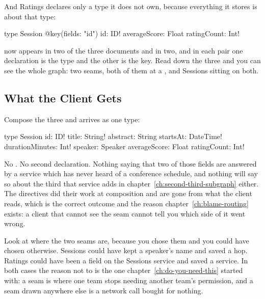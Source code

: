 %
And Ratings declares only a type it does not own, because everything it
stores is about that type:

\begin{graphqlsdl}
type Session @key(fields: "id") {
  id: ID!
  averageScore: Float
  ratingCount: Int!
}
\end{graphqlsdl}

%
 now appears in two of the three documents and  in
two, and in each pair one declaration is the type and the other is the key. Read
down the three and you can see the whole graph: two seams, both of them at a
, and Sessions sitting on both.

\subsection{What the Client Gets}

%
Compose the three and  arrives as one type:

\begin{graphqlsdl}
type Session {
  id: ID!
  title: String!
  abstract: String
  startsAt: DateTime!
  durationMinutes: Int!
  speaker: Speaker
  averageScore: Float
  ratingCount: Int!
}
\end{graphqlsdl}

%
No . No second declaration. Nothing saying that two of those fields
are answered by a service which has never heard of a conference schedule, and
nothing will say so about the third that service adds in
chapter~\ref{ch:second-third-subgraph} either. The
directives did their work at composition and are gone from what the client
reads, which is the correct outcome and the reason
chapter~\ref{ch:blame-routing} exists: a client that cannot see the seam cannot
tell you which side of it went wrong.

%
Look at where the two seams are, because you chose them and you could have
chosen otherwise. Sessions could have kept a speaker's name and saved a hop.
Ratings could have been a field on the Sessions service and saved a service. In
both cases the reason not to is the one chapter~\ref{ch:do-you-need-this}
started with: a seam is where one team stops needing another team's permission,
and a seam drawn anywhere else is a network call bought for nothing.

